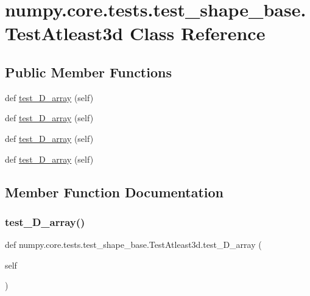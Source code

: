 \hypertarget{classnumpy_1_1core_1_1tests_1_1test__shape__base_1_1TestAtleast3d}{}\section{numpy.\+core.\+tests.\+test\+\_\+shape\+\_\+base.\+Test\+Atleast3d Class Reference}
\label{classnumpy_1_1core_1_1tests_1_1test__shape__base_1_1TestAtleast3d}
\subsection*{Public Member Functions}
\begin{DoxyCompactItemize}
\item 
def \hyperlink{classnumpy_1_1core_1_1tests_1_1test__shape__base_1_1TestAtleast3d_ab4a22c416caac6c677140aee699c6a65}{test\+\_\+D\+\_\+array} (self)
\item 
def \hyperlink{classnumpy_1_1core_1_1tests_1_1test__shape__base_1_1TestAtleast3d_a69dc9778a4e0efb58cb1fe6d72ce3c36}{test\+\_\+D\+\_\+array} (self)
\item 
def \hyperlink{classnumpy_1_1core_1_1tests_1_1test__shape__base_1_1TestAtleast3d_a68bb7f170c8b8a5ada27f1169d3c4438}{test\+\_\+D\+\_\+array} (self)
\item 
def \hyperlink{classnumpy_1_1core_1_1tests_1_1test__shape__base_1_1TestAtleast3d_a8117702dc988914c89c2ac0559a528c8}{test\+\_\+D\+\_\+array} (self)
\end{DoxyCompactItemize}


\subsection{Member Function Documentation}
\mbox{\label{classnumpy_1_1core_1_1tests_1_1test__shape__base_1_1TestAtleast3d_ab4a22c416caac6c677140aee699c6a65}} 
\subsubsection{\texorpdfstring{test\+\_\+D\+\_\+array()}{test\_0D\_array()}}
{\footnotesize\ttfamily def numpy.\+core.\+tests.\+test\+\_\+shape\+\_\+base.\+Test\+Atleast3d.\+test\+\_\+D\+\_\+array (\begin{DoxyParamCaption}\item[{}]{self }\end{DoxyParamCaption})}

